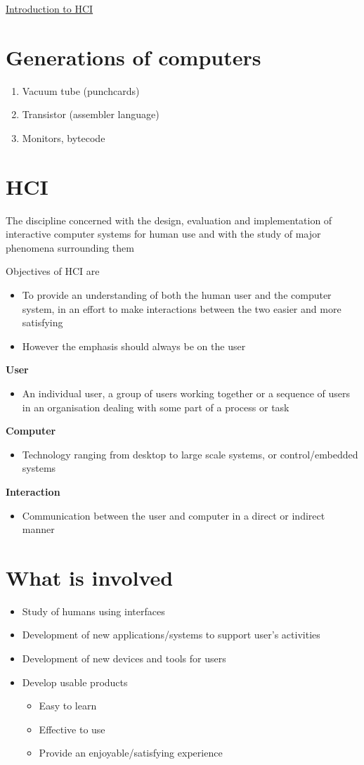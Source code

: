 \documentclass{article}[18pt]
\begin{document}
\begin{center}
\underline{\huge Introduction to HCI}
\end{center}
\section{Generations of computers}
\begin{enumerate}
	\item Vacuum tube (punchcards)
	\item Transistor (assembler language)
	\item Monitors, bytecode
\end{enumerate}
\section{HCI}
\begin{definition}[HCI]
The discipline concerned with the design, evaluation and implementation of interactive computer systems for human use and with the study of major phenomena surrounding them
\end{definition}
Objectives of HCI are
\begin{itemize}
	\item To provide an understanding of both the human user and the computer system, in an effort to make interactions between the two easier and more satisfying
	\item However the emphasis should always be on the user
\end{itemize}
\textbf{User}
\begin{itemize}
	\item An individual user, a group of users working together or a sequence of users in an organisation dealing with some part of a process or task
\end{itemize}
\textbf{Computer}
\begin{itemize}
	\item Technology ranging from desktop to large scale systems, or control/embedded systems
\end{itemize}
\textbf{Interaction}
\begin{itemize}
	\item Communication between the user and computer in a direct or indirect manner
\end{itemize}
\section{What is involved}
\begin{itemize}
	\item Study of humans using interfaces
	\item Development of new applications/systems to support user's activities
	\item Development of new devices and tools for users
	\item Develop usable products
	\begin{itemize}
		\item Easy to learn
		\item Effective to use
		\item Provide an enjoyable/satisfying experience
	\end{itemize}
\end{itemize}
\end{document}
